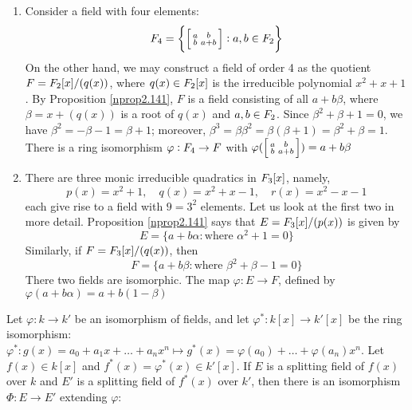 \documentclass[11pt]{article}
\begin{document}
\begin{examplle}[]
\begin{enumerate}
\item Consider a field with four elements:
\begin{equation*}
\relax{F}_4=\left\{\begin{bsmallmatrix}a&b\\b&a+b\end{bsmallmatrix}
:a,b\in\relax{F}_2
\right\}
\end{equation*}
On the other hand, we may construct a field of order 4 as the quotient
\(F=\relax{F}_2[x]/(q(x))\), where \(q(x)\in\relax{F}_2[x]\) is the irreducible
polynomial \(x^2+x+1\). By Proposition \ref{nprop2.141}, \(F\) is a field
consisting of all \(a+b\beta\), where \(\beta=x+(q(x))\) is a root of
\(q(x)\) and \(a,b\in\relax{F}_2\). Since \(\beta^2+\beta+1=0\), we have
\(\beta^2=-\beta-1=\beta+1\); moreover,
\(\beta^3=\beta\beta^2=\beta(\beta+1)=\beta^2+\beta=1\). There is a ring
isomorphism
\(\varphi:\relax{F}_4\to F\) with 
\(\varphi(\begin{bsmallmatrix}a&b\\b&a+b\end{bsmallmatrix})=a+b\beta\)
\item There are three monic irreducible quadratics in \(\relax{F}_3[x]\), namely,
\begin{equation*}
p(x)=x^2+1,\quad q(x)=x^2+x-1,\quad r(x)=x^2-x-1
\end{equation*}
each give rise to a field with \(9=3^2\) elements. Let us look at the
first two in more detail. Proposition \ref{nprop2.141} says that
\(E=\relax{F}_3[x]/(p(x))\) is given by
\begin{equation*}
E=\{a+b\alpha:\text{where }\alpha^2+1=0\}
\end{equation*}
Similarly, if \(F=\relax{F}_3[x]/(q(x))\), then
\begin{equation*}
F=\{a+b\beta:\text{where }\beta^2+\beta-1=0\}
\end{equation*}
There two fields are isomorphic. The map \(\varphi:E\to F\), defined by 
\(\varphi(a+b\alpha)=a+b(1-\beta)\)
\end{enumerate}
\end{examplle}

\begin{lemma}[]
\label{nlemma2.156}
Let \(\varphi:k\to k'\) be an isomorphism of fields, and let \(\varphi^*:k[x]\to k'[x]\)
be the ring isomorphism: 
\(\varphi^*:g(x)=a_0+a_1x+\dots+a_nx^n\mapsto
   g^*(x)=\varphi(a_0)+\dots+\varphi(a_n)x^n\). 
Let \(f(x)\in k[x]\) and \(f^*(x)=\varphi^*(x)\in k'[x]\). If \(E\) is a
splitting field of \(f(x)\) over \(k\) and \(E'\) is a splitting field of
\(f^*(x)\) over \(k'\), then there is an isomorphism \(\Phi:E\to E'\) extending \(\varphi\):
\end{lemma}
\end{document}
